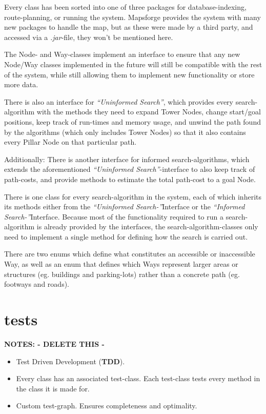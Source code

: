 Every class has been sorted into one of three packages for database-indexing, route-planning, or running the system. Mapsforge provides the system with many new packages to handle the map, but as these were made by a third party, and accessed via a \textit{.jar}-file, they won't be mentioned here.

The Node- and Way-classes implement an interface to ensure that any new Node/Way classes implemented in the future will still be compatible with the rest of the system, while still allowing them to implement new functionality or store more data.

There is also an interface for \textit{\textquotedblleft Uninformed Search\textquotedblright}, which provides every search-algorithm with the methods they need to expand Tower Nodes, change start/goal positions, keep track of run-times and memory usage, and unwind the path found by the algorithms (which only includes Tower Nodes) so that it also contains every Pillar Node on that particular path.

Additionally: There is another interface for informed search-algorithms, which extends the aforementioned \textit{\textquotedblleft Uninformed Search\textquotedblright}-interface to also keep track of path-costs, and provide methods to estimate the total path-cost to a goal Node.

There is one class for every search-algorithm in the system, each of which inherits its methods either from the \textit{\textquotedblleft Uninformed Search-\textquotedblright}Interface or the \textit{\textquotedblleft Informed Search-\textquotedblright}Interface. Because most of the functionality required to run a search-algorithm is already provided by the interfaces, the search-algorithm-classes only need to implement a single method for defining how the search is carried out.

There are two enums which define what constitutes an accessible or inaccessible Way, as well as an enum that defines which Ways represent larger areas or structures (eg. buildings and parking-lots) rather than a concrete path (eg. footways and roads).

\section{tests}
\textbf{NOTES: - DELETE THIS -}
\begin{itemize}
	\item Test Driven Development (\textbf{TDD}).
	\item Every class has an associated test-class. Each test-class tests every method in the class it is made for.
	\item Custom test-graph. Ensures completeness and optimality.
\end{itemize}

